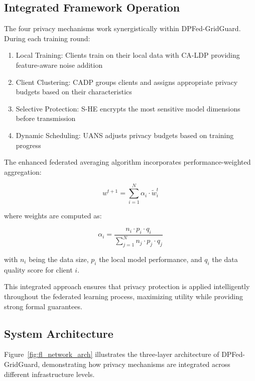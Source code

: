 \documentclass{ieeeaccess}
\theoremstyle{definition}
\begin{document}
\subsection{Integrated Framework Operation}

The four privacy mechanisms work synergistically within DPFed-GridGuard. During each training round:

\begin{enumerate}
    \item Local Training: Clients train on their local data with CA-LDP providing feature-aware noise addition
    \item Client Clustering: CADP groups clients and assigns appropriate privacy budgets based on their characteristics
    \item Selective Protection: S-HE encrypts the most sensitive model dimensions before transmission
    \item Dynamic Scheduling: UANS adjusts privacy budgets based on training progress
\end{enumerate}

The enhanced federated averaging algorithm incorporates performance-weighted aggregation:

\begin{equation}
w^{t+1} = \sum_{i=1}^{N} \alpha_i \cdot \tilde{w}_i^t
\end{equation}

where weights are computed as:

\begin{equation}
\alpha_i = \frac{n_i \cdot p_i \cdot q_i}{\sum_{j=1}^{N} n_j \cdot p_j \cdot q_j}
\end{equation}

with $n_i$ being the data size, $p_i$ the local model performance, and $q_i$ the data quality score for client $i$.

This integrated approach ensures that privacy protection is applied intelligently throughout the federated learning process, maximizing utility while providing strong formal guarantees.

\subsection{System Architecture}

Figure~\ref{fig:fl_network_arch} illustrates the three-layer architecture of DPFed-GridGuard, demonstrating how privacy mechanisms are integrated across different infrastructure levels.
\end{document}
